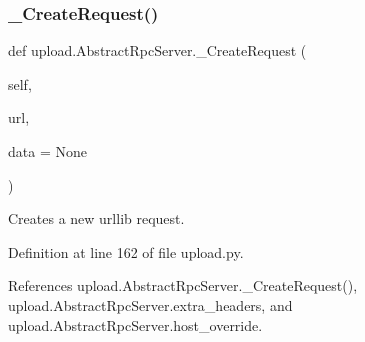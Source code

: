 \subsubsection{\texorpdfstring{\+\_\+\+Create\+Request()}{\_CreateRequest()}\hspace{0.1cm}{\footnotesize\ttfamily [1/2]}}
{\footnotesize\ttfamily def upload.\+Abstract\+Rpc\+Server.\+\_\+\+Create\+Request (\begin{DoxyParamCaption}\item[{}]{self,  }\item[{}]{url,  }\item[{}]{data = {\ttfamily None} }\end{DoxyParamCaption})\hspace{0.3cm}{\ttfamily [private]}}

\begin{DoxyVerb}Creates a new urllib request.\end{DoxyVerb}
 

Definition at line 162 of file upload.\+py.



References upload.\+Abstract\+Rpc\+Server.\+\_\+\+Create\+Request(), upload.\+Abstract\+Rpc\+Server.\+extra\+\_\+headers, and upload.\+Abstract\+Rpc\+Server.\+host\+\_\+override.


